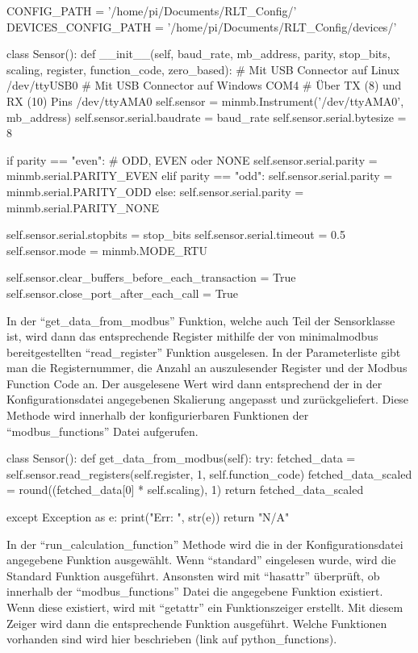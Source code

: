 \begin{pythoncode}
CONFIG_PATH = '/home/pi/Documents/RLT_Config/'
DEVICES_CONFIG_PATH = '/home/pi/Documents/RLT_Config/devices/'

class Sensor():
	def __init__(self, baud_rate, mb_address, parity, stop_bits, scaling, register, function_code, zero_based):
        # Mit USB Connector auf Linux       /dev/ttyUSB0
		# Mit USB Connector auf Windows     COM4
		# Über TX (8) und RX (10) Pins      /dev/ttyAMA0
		self.sensor = minmb.Instrument('/dev/ttyAMA0', mb_address)
		self.sensor.serial.baudrate = baud_rate
		self.sensor.serial.bytesize = 8
		
		if parity == "even":  # ODD, EVEN oder NONE
			self.sensor.serial.parity = minmb.serial.PARITY_EVEN
		elif parity == "odd":
			self.sensor.serial.parity = minmb.serial.PARITY_ODD
		else:
			self.sensor.serial.parity = minmb.serial.PARITY_NONE
		
		self.sensor.serial.stopbits = stop_bits
		self.sensor.serial.timeout = 0.5
		self.sensor.mode = minmb.MODE_RTU
		
		self.sensor.clear_buffers_before_each_transaction = True
		self.sensor.close_port_after_each_call = True
\end{pythoncode}

\label{get_data_from_modbus}
In der \enquote{get\_data\_from\_modbus} Funktion, welche auch Teil der Sensorklasse ist, wird dann das entsprechende Register mithilfe der von minimalmodbus bereitgestellten \enquote{read\_register} Funktion ausgelesen. In der Parameterliste gibt man die Registernummer, die Anzahl an auszulesender Register und der Modbus Function Code an. Der ausgelesene Wert wird dann entsprechend der in der Konfigurationsdatei angegebenen Skalierung angepasst und zurückgeliefert. Diese Methode wird innerhalb der konfigurierbaren Funktionen  der \enquote{modbus\_functions} Datei aufgerufen.

\begin{pythoncode}
class Sensor():
	def get_data_from_modbus(self):
		try:
			fetched_data = self.sensor.read_registers(self.register, 1, self.function_code)
			fetched_data_scaled = round((fetched_data[0] * self.scaling), 1)
			return fetched_data_scaled
		
		except Exception as e:
			print("Err: ", str(e))
			return "N/A"
\end{pythoncode}

In der \enquote{run\_calculation\_function} Methode wird die in der Konfigurationsdatei angegebene Funktion ausgewählt. Wenn \enquote{standard} eingelesen wurde, wird die Standard Funktion ausgeführt. Ansonsten wird mit \enquote{hasattr} überprüft, ob innerhalb der \enquote{modbus\_functions} Datei die angegebene Funktion existiert. Wenn diese existiert, wird mit \enquote{getattr} ein Funktionszeiger erstellt. Mit diesem Zeiger wird dann die entsprechende Funktion ausgeführt. Welche Funktionen vorhanden sind wird hier beschrieben (link auf python\_functions). 

